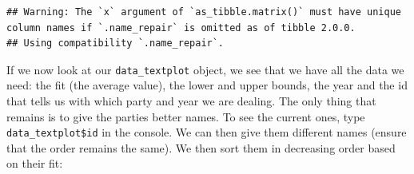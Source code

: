 \documentclass[
]{article}
\newenvironment{Shaded}{\begin{snugshade}}{\end{snugshade}}
\newcommand{\AttributeTok}[1]{\textcolor[rgb]{0.77,0.63,0.00}{#1}}
\newcommand{\DecValTok}[1]{\textcolor[rgb]{0.00,0.00,0.81}{#1}}
\newcommand{\FunctionTok}[1]{\textcolor[rgb]{0.00,0.00,0.00}{#1}}
\newcommand{\NormalTok}[1]{#1}
\newcommand{\OtherTok}[1]{\textcolor[rgb]{0.56,0.35,0.01}{#1}}
\newcommand{\SpecialCharTok}[1]{\textcolor[rgb]{0.00,0.00,0.00}{#1}}
\newcommand{\StringTok}[1]{\textcolor[rgb]{0.31,0.60,0.02}{#1}}
\begin{document}
\begin{Shaded}
\end{Shaded}

\begin{verbatim}
## Warning: The `x` argument of `as_tibble.matrix()` must have unique column names if `.name_repair` is omitted as of tibble 2.0.0.
## Using compatibility `.name_repair`.
\end{verbatim}

If we now look at our \texttt{data\_textplot} object, we see that we have all the data we need: the fit (the average value), the lower and upper bounds, the year and the id that tells us with which party and year we are dealing. The only thing that remains is to give the parties better names. To see the current ones, type \texttt{data\_textplot\$id} in the console. We can then give them different names (ensure that the order remains the same). We then sort them in decreasing order based on their fit:

\begin{Shaded}
\end{Shaded}
\end{document}

